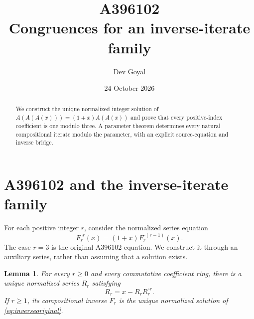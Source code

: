\documentclass[11pt,a4paper]{article}
\title{A396102\\[3pt]Congruences for an inverse-iterate family}
\author{Dev Goyal}
\date{24 October 2026}
\newtheorem{lemma}[theorem]{Lemma}
\theoremstyle{remark}
\begin{document}
\maketitle
\begin{center}
\end{center}
\begin{abstract}
We construct the unique normalized integer solution of $A(A(A(x)))=(1+x)A(A(x))$ and prove that every positive-index coefficient is one modulo three. A parameter theorem determines every natural compositional iterate modulo the parameter, with an explicit source-equation and inverse bridge.
\end{abstract}
\section{A396102 and the inverse-iterate family}

For each positive integer $r$, consider the normalized series equation
\begin{equation}\label{eq:inverseoriginal}
F_r^{\circ r}(x)=(1+x)F_r^{\circ(r-1)}(x).
\end{equation}
The case $r=3$ is the original A396102 equation. We construct it through
an auxiliary series, rather than assuming that a solution exists.

\begin{lemma}\label{lem:inverseconstruct}
For every $r\ge0$ and every commutative coefficient ring, there is a
unique normalized series $R_r$ satisfying
\begin{equation}\label{eq:inverseaux}
R_r=x-R_r R_r^{\circ r}.
\end{equation}
If $r\ge1$, its compositional inverse $F_r$ is the unique normalized
solution of \eqref{eq:inverseoriginal}.
\end{lemma}
\end{document}

